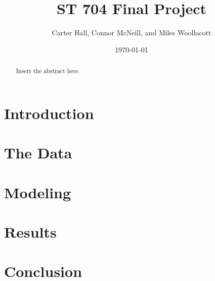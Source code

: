 \documentclass[12pt]{report}   	%
\title{{\bf{ST 704 Final Project}}}
\author{Carter Hall, Connor McNeill, and Miles Woollacott}
\date{\today}							%
\begin{document}
\maketitle

\begin{abstract}
    Insert the abstract here.
\end{abstract}

\section*{Introduction}

\section*{The Data}

\section*{Modeling}

\section*{Results}

\section*{Conclusion}
\end{document}
